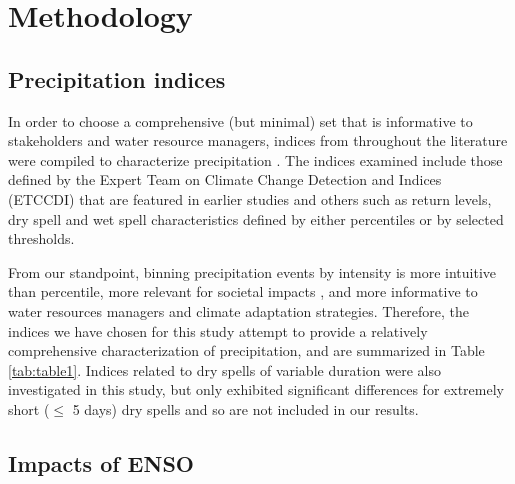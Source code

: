 \documentclass{ametsoc}
\begin{document}

\section{Methodology} \label{sec:Methodology}

\subsection{Precipitation indices}

In order to choose a comprehensive (but minimal) set that is informative to stakeholders and water resource managers, indices from throughout the literature were compiled to characterize precipitation \citep{tebaldi2006going, zhang2011indices, sillmann2013climate}. The indices examined include those defined by the Expert Team on Climate Change Detection and Indices (ETCCDI) \citep{karl1999clivar} that are featured in earlier studies \citep{diffenbaugh2005fine, duliere2011extreme, sillmann2013climate, singh2013precipitation} and others such as return levels, dry spell and wet spell characteristics defined by either percentiles or by selected thresholds.


From our standpoint, binning precipitation events by intensity is more intuitive than percentile, more relevant for societal impacts \citep{alexander2006global}, and more informative to water resources managers and climate adaptation strategies. Therefore, the indices we have chosen for this study attempt to provide a relatively comprehensive characterization of precipitation, and are summarized in Table \ref{tab:table1}. Indices related to dry spells of variable duration were also investigated in this study, but only exhibited significant differences for extremely short ($\leq$ 5 days) dry spells and so are not included in our results.


\subsection{Impacts of ENSO}
\end{document}
